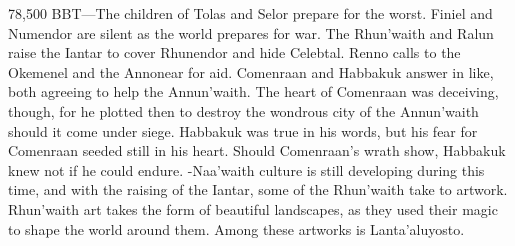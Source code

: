 \documentclass[smalldemyvopaper,11pt,twoside,onecolumn,openright,extrafontsizes]{memoir}
\begin{document}
{{78,500 BBT—The children of Tolas and Selor prepare for the worst. Finiel and Numendor are silent as the world prepares for war. The Rhun’waith and Ralun raise the Iantar to cover Rhunendor and hide Celebtal. Renno calls to the Okemenel and the Annonear for aid. Comenraan and Habbakuk answer in like, both agreeing to help the Annun’waith. The heart of Comenraan was deceiving, though, for he plotted then to destroy the wondrous city of the Annun’waith should it come under siege. Habbakuk was true in his words, but his fear for Comenraan seeded still in his heart. Should Comenraan’s wrath show, Habbakuk knew not if he could endure.
-Naa’waith culture is still developing during this time, and with the raising of the Iantar, some of the Rhun’waith take to artwork. Rhun’waith art takes the form of beautiful landscapes, as they used their magic to shape the world around them. Among these artworks is Lanta’aluyosto.
}}
\end{document}
